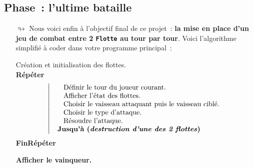 \documentclass[10pt, fleqn, a4paper]{article}
\newenvironment{algorithme}
{
\begingroup

\footnotesize

\hrulefill

}
{

\hrulefill

\endgroup
}
\newcounter{quest}
\begin{document}
\addtocounter{quest}{1}
\subsection*{Phase~\thequest : l'ultime bataille}
\label{phase_bataille1}

\begin{itemize}
\item[$\looparrowright$] Nous voici enfin à l'objectif final de ce projet~: \textbf{la mise en place d'un \og{}jeu de combat\fg{} entre 2 \texttt{Flotte} au tour par tour}. Voici l'algorithme simplifié à coder dans votre programme principal~:

\begin{algorithme}
Création et initialisation des flottes.\\
\textbf{Répéter}
\begin{equation*}
\left| \begin{array}{l}
\hspace{5mm}\text{Définir le tour du joueur courant.} \\
\hspace{5mm}\text{Afficher l'état des flottes.} \\
\hspace{5mm}\text{Choisir le vaisseau attaquant puis le vaisseau ciblé.} \\
\hspace{5mm}\text{Choisir le type d'attaque.} \\
\hspace{5mm}\text{Résoudre l'attaque.} \\
\hspace{2mm}\text{\bf Jusqu'à (\textit{destruction d'une des 2 flottes})}
\end{array} \right.
\end{equation*}
\textbf{FinRépéter}

\textbf{Afficher le vainqueur.}

\end{algorithme}


\end{itemize}
\end{document}
